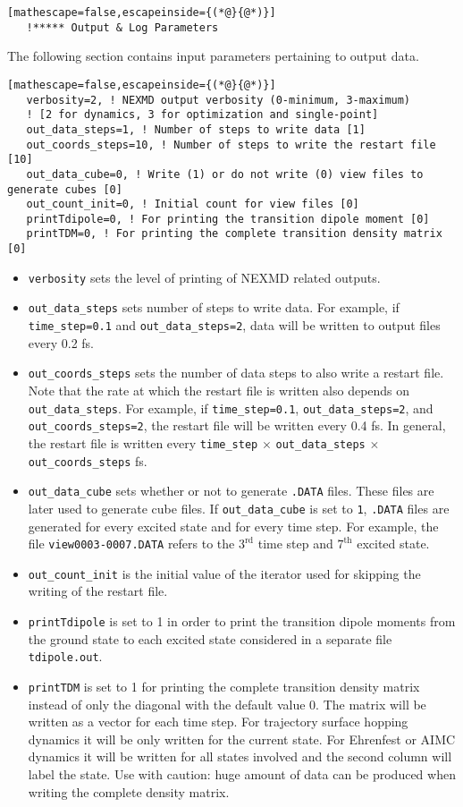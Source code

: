 \begin{lstlisting}[mathescape=false,escapeinside={(*@}{@*)}]
   !***** Output & Log Parameters
\end{lstlisting}
\noindent The following section contains input parameters pertaining to output data.
\begin{lstlisting}[mathescape=false,escapeinside={(*@}{@*)}]
   verbosity=2, ! NEXMD output verbosity (0-minimum, 3-maximum)
   ! [2 for dynamics, 3 for optimization and single-point]
   out_data_steps=1, ! Number of steps to write data [1]
   out_coords_steps=10, ! Number of steps to write the restart file [10]
   out_data_cube=0, ! Write (1) or do not write (0) view files to generate cubes [0]
   out_count_init=0, ! Initial count for view files [0]
   printTdipole=0, ! For printing the transition dipole moment [0]
   printTDM=0, ! For printing the complete transition density matrix [0]
\end{lstlisting}
\begin{itemize}
\item \verb+verbosity+ sets the level of printing of NEXMD related outputs.
\item \verb+out_data_steps+ sets number of steps to write data.  For example, if \verb+time_step=0.1+ and \verb+out_data_steps=2+, data will be written to output files every 0.2 fs.
\item \verb+out_coords_steps+ sets the number of data steps to also write a restart file.  Note that the rate at which the restart file is written also depends on \verb+out_data_steps+.  For example, if \verb+time_step=0.1+, \verb+out_data_steps=2+, and \verb+out_coords_steps=2+, the restart file will be written every 0.4 fs.  In general, the restart file is written every \verb+time_step+ $\times$ \verb+out_data_steps+ $\times$ \verb+out_coords_steps+ fs.
\item \verb+out_data_cube+ sets whether or not to generate \verb+.DATA+ files.  These files are later used to generate cube files.  If \verb+out_data_cube+ is set to \verb+1+, \verb+.DATA+ files are generated for every excited state and for every time step.  For example, the file \verb+view0003-0007.DATA+ refers to the $3^{\text{rd}}$ time step and $7^{\text{th}}$ excited state.
\item \verb+out_count_init+ is the initial value of the iterator used for skipping the writing of the restart file.
\item \verb+printTdipole+ is set to 1 in order to print the transition dipole moments from the ground state to each excited state considered in a separate file \verb+tdipole.out+.
\item \verb+printTDM+ is set to 1 for printing the complete transition density matrix instead of only the diagonal with the default value 0. The matrix will be written as a vector for each time step. For trajectory surface hopping dynamics it will be only written for the current state. For Ehrenfest or AIMC dynamics it will be written for all states involved and the second column will label the state. Use with caution: huge amount of data can be produced when writing the complete density matrix.
\end{itemize}

